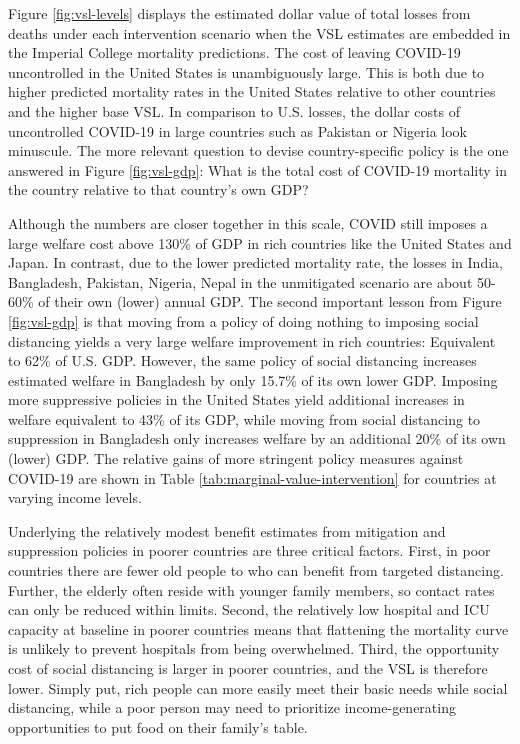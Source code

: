 \documentclass[11pt]{article}
\begin{document}
Figure \ref{fig:vsl-levels} displays the estimated dollar value of total losses from deaths under each intervention scenario when the \textcite{viscusi2017} VSL estimates are embedded in the Imperial College mortality predictions. The cost of leaving COVID-19 uncontrolled in the United States is unambiguously large. This is both due to higher predicted mortality rates in the United States relative to other countries and the higher base VSL. In comparison to U.S. losses, the dollar costs of uncontrolled COVID-19 in large countries such as Pakistan or Nigeria look minuscule. The more relevant question to devise country-specific policy is the one answered in Figure \ref{fig:vsl-gdp}: What is the total cost of COVID-19 mortality in the country relative to that country's own GDP? 

Although the numbers are closer together in this scale, COVID still imposes a large welfare cost above 130\% of GDP in rich countries like the United States and Japan. In contrast, due to the lower predicted mortality rate, the losses in India, Bangladesh, Pakistan, Nigeria, Nepal in the unmitigated scenario are about 50-60\% of their own (lower) annual GDP. The second important lesson from Figure \ref{fig:vsl-gdp} is that moving from a policy of doing nothing to imposing social distancing yields a very large welfare improvement in rich countries: Equivalent to 62\% of U.S. GDP. However, the same policy of social distancing increases estimated welfare in Bangladesh by only 15.7\% of its own lower GDP. Imposing more suppressive policies in the United States yield additional increases in welfare equivalent to 43\% of its GDP, while moving from social distancing to suppression in Bangladesh only increases welfare by an additional 20\% of its own (lower) GDP. The relative gains of more stringent policy measures against COVID-19 are shown in Table \ref{tab:marginal-value-intervention} for countries at varying income levels. 

Underlying the relatively modest benefit estimates from mitigation and suppression policies in poorer countries are three critical factors. First, in poor countries there are fewer old people to who can benefit from targeted distancing. Further, the elderly often reside with younger family members, so contact rates can only be reduced within limits. Second, the relatively low hospital and ICU capacity at baseline in poorer countries means that flattening the mortality curve is unlikely to prevent hospitals from being overwhelmed. Third, the opportunity cost of social distancing is larger in poorer countries, and the VSL is therefore lower. Simply put, rich people can more easily meet their basic needs while social distancing, while a poor person may need to prioritize income-generating opportunities to put food on their family's table.
\end{document}
